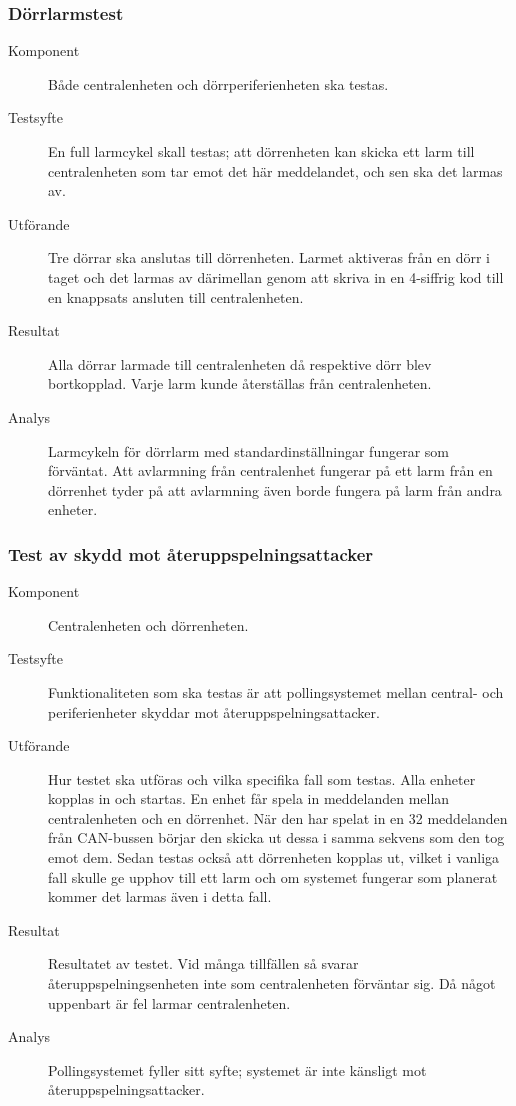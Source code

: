 \documentclass[a4paper]{article}
\begin{document}
\subsubsection{Dörrlarmstest}
\begin{description}
\item[Komponent] Både centralenheten och dörrperiferienheten ska testas.

\item[Testsyfte] En full larmcykel skall testas; att dörrenheten kan skicka ett larm till centralenheten som tar emot det här meddelandet, och sen ska det larmas av.

\item[Utförande] Tre dörrar ska anslutas till dörrenheten. Larmet aktiveras från en dörr i taget och det larmas av därimellan genom att skriva in en 4-siffrig kod till en knappsats ansluten till centralenheten.

\item[Resultat] Alla dörrar larmade till centralenheten då respektive dörr blev bortkopplad. Varje larm kunde återställas från centralenheten.

\item[Analys] Larmcykeln för dörrlarm med standardinställningar fungerar som förväntat.
Att avlarmning från centralenhet fungerar på ett larm från en dörrenhet tyder på att avlarmning även borde fungera på larm från andra enheter.
\end{description}

\subsubsection{Test av skydd mot återuppspelningsattacker}
\begin{description}
\item[Komponent] Centralenheten och dörrenheten.

\item[Testsyfte] Funktionaliteten som ska testas är att pollingsystemet mellan central- och periferienheter skyddar mot återuppspelningsattacker.

\item[Utförande] Hur testet ska utföras och vilka specifika fall som testas.
Alla enheter kopplas in och startas.
En enhet får spela in meddelanden mellan centralenheten och en dörrenhet.
När den har spelat in en 32 meddelanden från CAN-bussen börjar den skicka ut dessa i samma sekvens som den tog emot dem.
Sedan testas också att dörrenheten kopplas ut, vilket i vanliga fall skulle ge upphov till ett larm och om systemet fungerar som planerat kommer det larmas även i detta fall.

\item[Resultat] Resultatet av testet. Vid många tillfällen så svarar återuppspelningsenheten inte som centralenheten förväntar sig.
Då något uppenbart är fel larmar centralenheten.

\item[Analys] Pollingsystemet fyller sitt syfte; systemet är inte känsligt mot återuppspelningsattacker.
\end{description}
\end{document}
